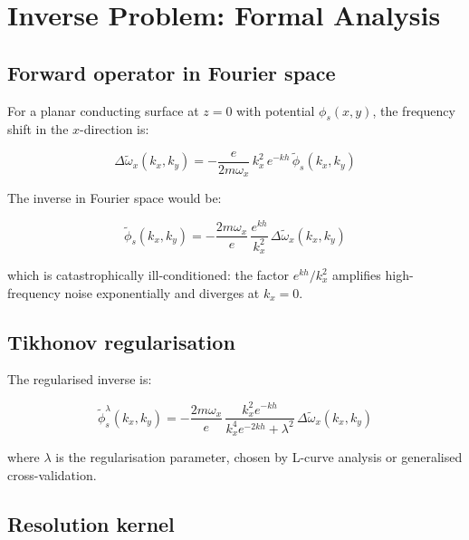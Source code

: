 \documentclass[11pt,a4paper]{article}
\begin{document}
\section{Inverse Problem: Formal Analysis}

\subsection{Forward operator in Fourier space}

For a planar conducting surface at $z = 0$ with potential $\phi_s(x,y)$,
the frequency shift in the $x$-direction is:

\begin{equation}
\Delta\tilde{\omega}_x(k_x, k_y) = -\frac{e}{2m\omega_x}\,
    k_x^2\,e^{-kh}\,\tilde{\phi}_s(k_x, k_y)
\label{eq:forward_fourier}
\end{equation}

The inverse in Fourier space would be:

\begin{equation}
\tilde{\phi}_s(k_x, k_y) = -\frac{2m\omega_x}{e}\,
    \frac{e^{kh}}{k_x^2}\,\Delta\tilde{\omega}_x(k_x, k_y)
\label{eq:inverse_fourier_naive}
\end{equation}

which is catastrophically ill-conditioned: the factor $e^{kh}/k_x^2$ amplifies
high-frequency noise exponentially and diverges at $k_x = 0$.

\subsection{Tikhonov regularisation}

The regularised inverse is:

\begin{equation}
\tilde{\phi}_s^{\lambda}(k_x, k_y) = -\frac{2m\omega_x}{e}\,
    \frac{k_x^2 e^{-kh}}{k_x^4 e^{-2kh} + \lambda^2}\,
    \Delta\tilde{\omega}_x(k_x, k_y)
\label{eq:tikhonov_fourier}
\end{equation}

where $\lambda$ is the regularisation parameter, chosen by L-curve analysis
or generalised cross-validation.

\subsection{Resolution kernel}
\end{document}
